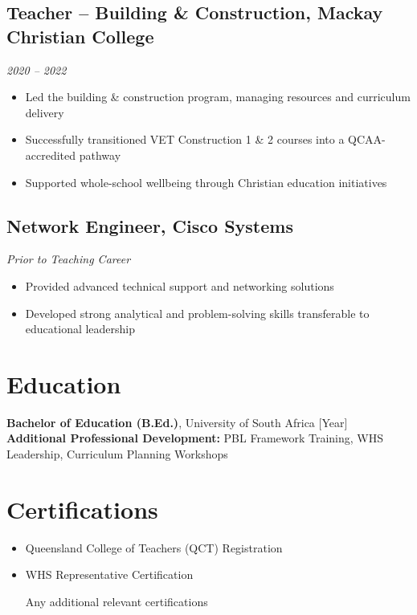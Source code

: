 \documentclass[11pt,a4paper]{article}
\begin{document}
\subsection*{Teacher – Building \& Construction, Mackay Christian College}
\textit{2020 – 2022}
\begin{itemize}
    \item Led the building \& construction program, managing resources and curriculum delivery
    \item Successfully transitioned VET Construction 1 \& 2 courses into a QCAA-accredited pathway
    \item Supported whole-school wellbeing through Christian education initiatives
\end{itemize}

\subsection*{Network Engineer, Cisco Systems}
\textit{Prior to Teaching Career}
\begin{itemize}
    \item Provided advanced technical support and networking solutions
    \item Developed strong analytical and problem-solving skills transferable to educational leadership
\end{itemize}

\section*{Education}
\textbf{Bachelor of Education (B.Ed.)}, University of South Africa \hfill [Year] \\
\textbf{Additional Professional Development:} PBL Framework Training, WHS Leadership, Curriculum Planning Workshops

\section*{Certifications}
\begin{itemize}
    \item Queensland College of Teachers (QCT) Registration
    \item WHS Representative Certification
    \item [Any additional relevant certifications]
\end{itemize}
\end{document}
